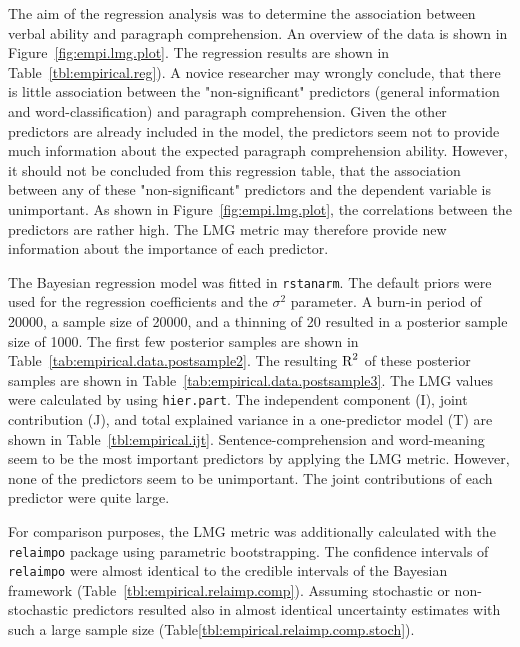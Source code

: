 \documentclass[11pt,a4paper,twoside]{book}\usepackage[]{graphicx}\usepackage[]{color}
\begin{document}
The aim of the regression analysis was to determine the  association between verbal ability and paragraph comprehension.  
An overview of the data is shown in Figure~\ref{fig:empi.lmg.plot}. The regression results are shown in Table~\ref{tbl:empirical.reg}). A novice researcher may wrongly conclude, that there is little association between the "non-significant" predictors (general information and word-classification) and paragraph comprehension. Given the other predictors are already included in the model, the predictors seem not to provide  much information about the expected paragraph comprehension ability. However, it should not be concluded from this regression table, that the association between any of these "non-significant" predictors and the dependent variable is unimportant. As shown in Figure~\ref{fig:empi.lmg.plot}, the correlations between the predictors are rather high. The LMG metric may therefore provide new information about the importance of each predictor. 

The Bayesian regression model was fitted in \texttt{rstanarm}. The default priors were used for the regression coefficients and the $\sigma^2$ parameter. A burn-in period of 20000, a sample size of 20000, and a thinning of 20 resulted in a posterior sample size of 1000. The first few posterior samples are shown in Table~\ref{tab:empirical.data.postsample2}. The resulting $\text{R}^2$ of these posterior samples are shown in Table~\ref{tab:empirical.data.postsample3}. The LMG values were calculated by using \texttt{hier.part}. The  independent component (I), joint contribution (J), and total explained variance in a one-predictor model (T) are shown in Table~\ref{tbl:empirical.ijt}. Sentence-comprehension and word-meaning seem to be the most important predictors by applying the LMG metric. However, none of the predictors seem to be unimportant.  The joint contributions of each predictor were quite large.

For comparison purposes, the LMG metric was additionally calculated with the \texttt{relaimpo} package using parametric bootstrapping. The confidence intervals of  \texttt{relaimpo} were almost identical to the credible intervals of the Bayesian framework (Table~\ref{tbl:empirical.relaimp.comp}). Assuming stochastic or non-stochastic predictors resulted also in almost identical uncertainty estimates with such a large sample size (Table\ref{tbl:empirical.relaimp.comp.stoch}). 
\end{document}
